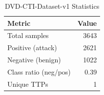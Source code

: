 \begin{table}[t]
\centering
\caption{DVD-CTI-Dataset-v1 Statistics}
\label{tab:dataset}
\begin{tabular}{lr}
\toprule
Metric & Value \\
\midrule
Total samples & 3643 \\
Positive (attack) & 2621 \\
Negative (benign) & 1022 \\
Class ratio (neg/pos) & 0.39 \\
Unique TTPs & 1 \\
\bottomrule
\end{tabular}
\end{table}